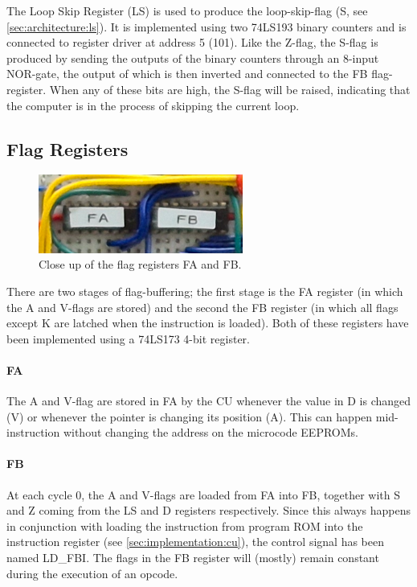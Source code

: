 The Loop Skip Register (LS) is used to produce the loop-skip-flag (S, see \ref{sec:architecture:ls}). It is implemented using two 74LS193 binary counters and is connected to register driver at address 5 (101). Like the Z-flag, the S-flag is produced by sending the outputs of the binary counters through an 8-input NOR-gate, the output of which is then inverted and connected to the FB flag-register. When any of these bits are high, the S-flag will be raised, indicating that the computer is in the process of skipping the current loop.



\newpage\subsection{Flag Registers}
\begin{figure}[H]
  \centering
  \includegraphics[width=0.6\textwidth]{img/flagregistercloseup}
  \caption{Close up of the flag registers FA and FB.}
  \label{fig:ramcloseup}
\end{figure}

There are two stages of flag-buffering; the first stage is the FA register (in which the A and V-flags are stored) and the second the FB register (in which all flags except K are latched when the instruction is loaded). Both of these registers have been implemented using a 74LS173 4-bit register.

\paragraph{FA} The A and V-flag are stored in FA by the CU whenever the value in D is changed (V) or whenever the pointer is changing its position (A). This can happen mid-instruction without changing the address on the microcode EEPROMs.

\paragraph{FB} At each cycle 0, the A and V-flags are loaded from FA into FB, together with S and Z coming from the LS and D registers respectively. Since this always happens in conjunction with loading the instruction from program ROM into the instruction register (see \ref{sec:implementation:cu}), the control signal has been named LD\_FBI. The flags in the FB register will (mostly) remain constant during the execution of an opcode.


